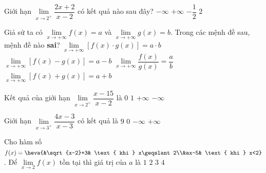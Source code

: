 \begin{ex}%
	Giới hạn $\lim\limits_{x\to{2^{+}}}\dfrac{2x+2}{x-2}$ có kết quả nào sau  đây?
	 \choice
		 {$-\infty$}
		 {\True $+\infty$}
		 {$-\dfrac{1}{2}$}
		 {$2$}
\end{ex}

\begin{ex}%
	Giả sử ta có $\lim\limits_{x\to +\infty}f(x)=a$ và $\lim\limits_{x\to +\infty}g(x)=b$. Trong các mệnh đề  sau, mệnh đề nào \textbf{sai}?
	 \choice
		{$\lim\limits_{x\to +\infty}\left[f(x)\cdot  g(x)\right]=a\cdot b$}
		{$\lim\limits_{x\to  +\infty}\left[f(x)-g(x)\right]=a-b$}
		{\True $\lim\limits_{x\to  +\infty}\dfrac{f(x)}{g(x)}=\dfrac{a}{b}$}
		 {$\lim\limits_{x\to +\infty}\left[f(x)+g(x)\right]=a+b$}
\end{ex}

\begin{ex}%
	Kết quả của giới hạn $\lim\limits_{x\to 2^+}\dfrac{x-15}{x-2}$  là
	 \choice
		 {$0$}
		{$1$} 
		{$+\infty$} 
		 {\True $-\infty$}
\end{ex}

\begin{ex}%
	Giới  hạn $\lim\limits_{x\to 3^+}\dfrac{4x-3}{x-3}$ có kết quả là
	\choice 
		 {$9$}
		 {$0$}
		 {$-\infty$}
		{\True $+\infty$} 
\end{ex}

\begin{ex}%
	Cho hàm số $f(x)=\heva{&\sqrt{x-2}+3& \text{ khi } x\geqslant 2\\&ax-5& \text{ khi } x<2} $. Để $\lim \limits_{x\to 2} f(x)$ tồn  tại thì giá trị của $a$ là
	 \choice
		 {$1$}
		 {$2$}
		 {$3$}
		{\True  $4$}
\end{ex}

